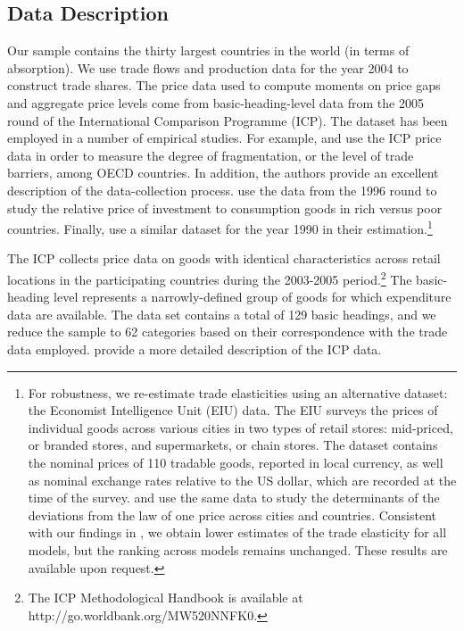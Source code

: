 \documentclass[12pt,dvips, ps2pdf]{article}
\begin{document}
\subsection{Data Description}\label{section:data}

Our sample contains the thirty largest countries in the world (in terms of absorption). We use trade flows and production data for the year 2004 to construct trade shares. The price data used to compute moments on price gaps and aggregate price levels come from basic-heading-level data from the 2005 round of the International Comparison Programme (ICP). The dataset has been employed in a number of empirical studies. For example, \citet{bradford_restat} and \citet{bradford} use the ICP price data in order to measure the degree of fragmentation, or the level of trade barriers, among OECD countries. In addition, the authors provide an excellent description of the data-collection process. \citet{hk04} use the data from the 1996 round to study the relative price of investment to consumption goods in rich versus poor countries. Finally, \citet{ek02} use a similar dataset for the year 1990 in their estimation.\footnote{For robustness, we re-estimate trade elasticities using an alternative dataset: the Economist Intelligence Unit (EIU) data. The EIU surveys the prices of individual goods across various cities in two types of retail stores: mid-priced, or branded stores, and supermarkets, or chain stores. The dataset contains the nominal prices of 110 tradable goods, reported in local currency, as well as nominal exchange rates relative to the US dollar, which are recorded at the time of the survey. \citet{crucini_tz} and \citet{crucini_hakan} use the same data to study the determinants of the deviations from the law of one price across cities and countries. Consistent with our findings in \citet{sw_jie}, we obtain lower estimates of the trade elasticity for all models, but the ranking across models remains unchanged. These results are available upon request.}

The ICP collects price data on goods with identical characteristics across retail locations in the participating countries during the 2003-2005 period.\footnote{The ICP Methodological Handbook is available at http://go.worldbank.org/MW520NNFK0.} The basic-heading level represents a narrowly-defined group of goods for which expenditure data are available. The data set contains a total of 129 basic headings, and we reduce the sample to 62 categories based on their correspondence with the trade data employed. \citet{sw_jie} provide a more detailed description of the ICP data.
\end{document}
